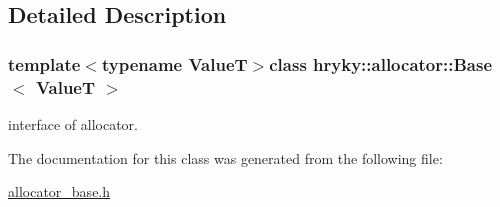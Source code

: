 \subsection{Detailed Description}
\subsubsection*{template$<$typename Value\-T$>$class hryky\-::allocator\-::\-Base$<$ Value\-T $>$}

interface of allocator. 

The documentation for this class was generated from the following file\-:\begin{DoxyCompactItemize}
\item 
\hyperlink{allocator__base_8h}{allocator\-\_\-base.\-h}\end{DoxyCompactItemize}
